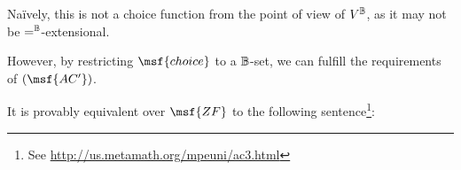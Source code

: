 \documentclass[11pt]{article}
\begin{document}
Na\"ively, this is not a choice function from the point of view of $V^{\mathbb{B}}$, as it may not be $=^{\mathbb{B}}$-extensional.

However, by restricting $\msf{choice}$ to a $\mathbb{B}$-set, we can fulfill the requirements of $(\msf{AC'})$.



It is provably equivalent over $\msf{ZF}$ to the following sentence\footnote{See \url{http://us.metamath.org/mpeuni/ac3.html}}:

\end{document}

